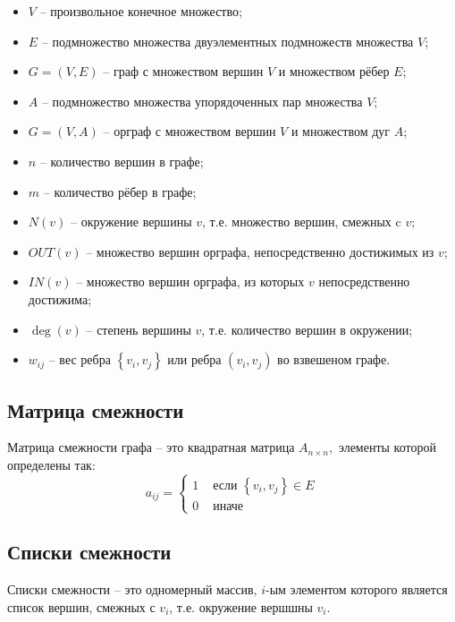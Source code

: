 \documentclass[40pt]{article}
\begin{document}
\begin{itemize}
    \item $V$ -- произвольное конечное множество; 
    \item $E$ -- подмножество множества двуэлементных подмножеств множества $V$;
    \item $G=(V, E)$ -- граф с множеством вершин $V$ и множеством рёбер $E$;
    \item $A$ -- подмножество множества упорядоченных пар множества $V$; 
    \item $G=(V, A)$ -- орграф с множеством вершин $V$ и множеством дуг $A$;
    \item $n$ -- количество вершин в графе;
    \item $m$ -- количество рёбер в графе;
    \item $N(v)$ -- окружение вершины $v$, т.е. множество вершин, смежных c $v$;
    \item $O U T(v)$ -- множество вершин орграфа, непосредственно достижимых из $v$;
    \item $I N(v)$ -- множество вершин орграфа, из которых $v$ непосредственно достижима;
    \item $\operatorname{deg}(v)$ -- степень вершины $v$, т.е. количество вершин в окружении;
    \item $w_{i j}$ -- вес ребра $\left\{v_{i}, v_{j}\right\}$ или ребра $\left(v_{i}, v_{j}\right)$ во взвешеном графе.
\end{itemize}

\subsection{Матрица смежности}

Матрица смежности графа -- это квадратная матрица $A_{n \times n},$ элементы которой определены так:
$$
a_{i j}=\left\{\begin{array}{ll}
1 & \text { если }\left\{v_{i}, v_{j}\right\} \in E \\
0 & \text { иначе }
\end{array}\right.
$$


\subsection{Списки смежности}

Списки смежности -- это одномерный массив, $i$-ым элементом которого является список вершин, смежных с $v_{i}$, т.е. окружение вершшны $v_{i}$.
\end{document}
